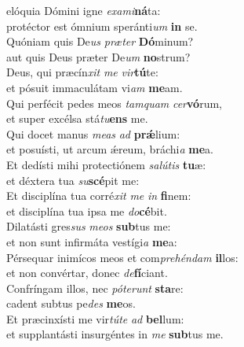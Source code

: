 \oddverse  elóquia Dómini igne \textit{e}\textit{xa}\textit{mi}\textbf{ná}ta:~\*\\
\oddverse protéctor est ómnium speránti\textit{um} \textbf{in} se.\\
\evenverse Quóniam quis De\textit{us} \textit{præ}\textit{ter} \textbf{Dó}minum?~\*\\
\evenverse aut quis Deus præter De\textit{um} \textbf{no}strum?\\
\oddverse Deus, qui præcín\textit{xit} \textit{me} \textit{vir}\textbf{tú}te:~\*\\
\oddverse et pósuit immaculátam vi\textit{am} \textbf{me}am.\\
\evenverse Qui perfécit pedes meos \textit{tam}\textit{quam} \textit{cer}\textbf{vó}rum,~\*\\
\evenverse et super excélsa stá\textit{tu}\textbf{ens} me.\\
\oddverse Qui docet manus \textit{me}\textit{as} \textit{ad} \textbf{prǽ}lium:~\*\\
\oddverse et posuísti, ut arcum ǽreum, bráchi\textit{a} \textbf{me}a.\\
\evenverse Et dedísti mihi protectiónem \textit{sa}\textit{lú}\textit{tis} \textbf{tu}æ:~\*\\
\evenverse et déxtera tua \textit{su}\textbf{scé}pit me:\\
\oddverse Et disciplína tua corré\textit{xit} \textit{me} \textit{in} \textbf{fi}nem:~\*\\
\oddverse et disciplína tua ipsa me \textit{do}\textbf{cé}bit.\\
\evenverse Dilatásti gres\textit{sus} \textit{me}\textit{os} \textbf{sub}tus me:~\*\\
\evenverse et non sunt infirmáta vestígi\textit{a} \textbf{me}a:\\
\oddverse Pérsequar inimícos meos et com\textit{pre}\textit{hén}\textit{dam} \textbf{il}los:~\*\\
\oddverse et non convértar, donec \textit{de}\textbf{fí}ciant.\\
\evenverse Confríngam illos, nec \textit{pó}\textit{te}\textit{runt} \textbf{sta}re:~\*\\
\evenverse cadent subtus pe\textit{des} \textbf{me}os.\\
\oddverse Et præcinxísti me vir\textit{tú}\textit{te} \textit{ad} \textbf{bel}lum:~\*\\
\oddverse et supplantásti insurgéntes in \textit{me} \textbf{sub}tus me.\\

